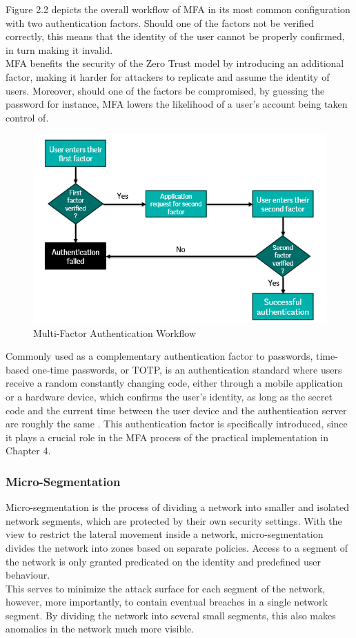 Figure 2.2 depicts the overall workflow of MFA in its most common configuration with two authentication factors. Should one of the factors not be verified correctly, this means that the identity of the user cannot be properly confirmed, in turn making it invalid.\\
MFA benefits the security of the Zero Trust model by introducing an additional factor, making it harder for attackers to replicate and assume the identity of users. Moreover, should one of the factors be compromised, by guessing the password for instance, MFA lowers the likelihood of a user's account being taken control of.

\begin{figure}[H]
	\centering
	\includegraphics[width=0.8 \linewidth]{Images/K4/mfa-diagram.png}
	\caption{Multi-Factor Authentication Workflow}
	\label{fig:mfa_workflow}
\end{figure}

Commonly used as a complementary authentication factor to passwords, time-based one-time passwords, or TOTP, is an authentication standard where users receive a random constantly changing code, either through a mobile application or a hardware device, which confirms the user's identity, as long as the secret code and the current time between the user device and the authentication server are roughly the same \cite{gilman_zero_2017}. This authentication factor is specifically introduced, since it plays a crucial role in the MFA process of the practical implementation in Chapter 4.

\subsubsection{Micro-Segmentation}
Micro-segmentation is the process of dividing a network into smaller and isolated network segments, which are protected by their own security settings. With the view to restrict the lateral movement inside a network, micro-segmentation divides the network into zones based on separate policies. Access to a segment of the network is only granted predicated on the identity and predefined user behaviour.\\
This serves to minimize the attack surface for each segment of the network, however, more importantly, to contain eventual breaches in a single network segment. By dividing the network into several small segments, this also makes anomalies in the network much more visible.

